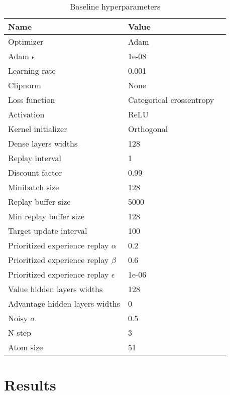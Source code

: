 \documentclass{article}
\begin{document}
\begin{table}
  \caption{Baseline hyperparameters}
  \label{tab:table}
  \centering
  \begin{tabular}{lll}
    \toprule
    \cmidrule(r){1-2}
    Name     & Value           \\
    \midrule
    Optimizer & Adam \\
    Adam $\epsilon$ & 1e-08  \\
    Learning rate & 0.001  \\
    Clipnorm & None  \\
    Loss function & Categorical crossentropy  \\
    Activation & ReLU  \\
    Kernel initializer & Orthogonal  \\
    Dense layers widths & 128  \\
    Replay interval & 1  \\
    Discount factor & 0.99  \\
    Minibatch size & 128  \\
    Replay buffer size & 5000  \\
    Min replay buffer size & 128  \\

    Target update interval & 100  \\

    Prioritized experience replay $\alpha$ & 0.2  \\
    Prioritized experience replay $\beta$ & 0.6  \\
    Prioritized experience replay $\epsilon$ & 1e-06  \\

    Value hidden layers widths & 128  \\
    Advantage hidden layers widths & 0  \\

    Noisy $\sigma$ & 0.5  \\

    N-step & 3  \\

    Atom size & 51  \\
    \bottomrule
  \end{tabular}
\end{table}


\section{Results}
\label{sec:others}
\end{document}
